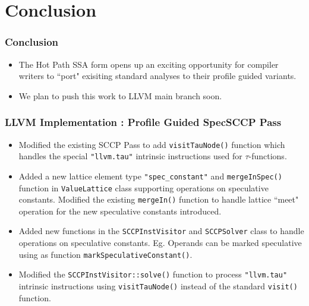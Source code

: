 \documentclass[aspectratio=169, compress]{beamer}
\begin{document}
\footnotesize

\section{Conclusion}
\begin{frame}
	\frametitle{Conclusion}
	\begin{itemize}
		\item The Hot Path SSA form opens up an exciting opportunity for compiler writers to ``port" exisiting standard analyses to their profile guided variants. \pause
		\item We plan to push this work to LLVM main branch soon. 
	\end{itemize}
\end{frame}

\begin{frame}
	\frametitle{LLVM Implementation : Profile Guided SpecSCCP Pass}
	\begin{itemize}
		\item Modified the existing SCCP Pass to add \texttt{visitTauNode()} function which handles the special \texttt{"llvm.tau"} intrinsic instructions used for $\tau$-functions.\footnotemark \pause
		\item Added a new lattice element type \texttt{"spec_constant"} and \texttt{mergeInSpec()} function in \texttt{ValueLattice} class supporting operations on speculative constants. Modified the existing \texttt{mergeIn()} function to handle lattice ``meet" operation for the new speculative constants introduced.  \pause
		\item Added new functions in the \texttt{SCCPInstVisitor} and \texttt{SCCPSolver} class to handle operations on speculative constants. Eg. Operands can be marked speculative using as function \texttt{markSpeculativeConstant()}. \pause
		\item Modified the \texttt{SCCPInstVisitor::solve()} function to process \texttt{"llvm.tau"} intrinsic instructions using \texttt{visitTauNode()} instead of the standard \texttt{visit()} function.
	\end{itemize}
	\tiny 
\end{frame}
\end{document}
